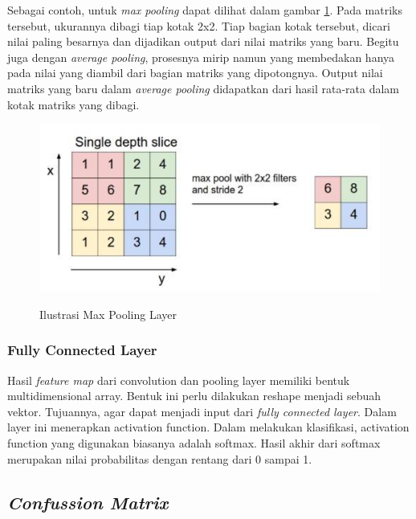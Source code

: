 Sebagai contoh, untuk \emph{max pooling} dapat dilihat dalam gambar \ref{fig:Ilustrasi Max Pooling Layer}. Pada matriks tersebut, ukurannya dibagi tiap kotak 2x2. Tiap bagian kotak tersebut, dicari nilai paling besarnya dan dijadikan output dari nilai matriks yang baru. Begitu juga dengan \emph{average pooling}, prosesnya mirip namun yang membedakan hanya pada nilai yang diambil dari bagian matriks yang dipotongnya. Output nilai matriks yang baru dalam \emph{average pooling} didapatkan dari hasil rata-rata dalam kotak matriks yang dibagi. 

\begin{figure} [ht] \centering  
  \includegraphics[scale=0.75]{gambar/max-pooling-layer.png}
  \caption{Ilustrasi Max Pooling Layer}
  \label{fig:Ilustrasi Max Pooling Layer}
  \parencite{MaxPoolingLayer}
\end{figure}

\subsubsection{Fully Connected Layer}
Hasil \emph{feature map} dari convolution dan pooling layer memiliki bentuk multidimensional array. Bentuk ini perlu dilakukan reshape menjadi sebuah vektor. Tujuannya, agar dapat menjadi input dari \emph{fully connected layer}. Dalam layer ini menerapkan activation function. Dalam melakukan klasifikasi, activation function yang digunakan biasanya adalah softmax. Hasil akhir dari softmax merupakan nilai probabilitas dengan rentang dari 0 sampai 1. 

\subsection{\emph{Confussion Matrix}}

